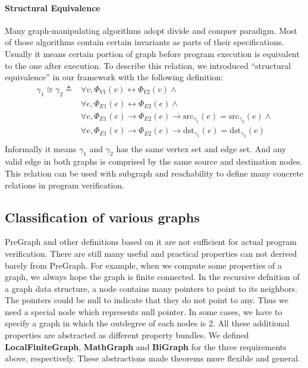\paragraph{Structural Equivalence}
Many graph-manipulating algorithms adopt divide and conquer
paradigm. Most of those algorithms contain certain invariants as parts
of their specifications. Usually it means certain portion of graph
before program execution is equivalent to the one after execution. To
describe this relation, we introduced ``structural equivalence'' in
our framework with the following definition:
\begin{equation*}
\begin{split}
\gamma_1 \cong\gamma_2 \triangleq & \forall v, \Phi_{V1}(v) \leftrightarrow \Phi_{V2}(v) \wedge \\
& \forall e, \Phi_{E1}(e) \leftrightarrow \Phi_{E2}(e) \wedge\\
& \forall e, \Phi_{E1}(e) \rightarrow \Phi_{E2}(e) \rightarrow \text{src}_{\gamma_1}(e)=\text{src}_{\gamma_2}(e) \wedge\\
& \forall e, \Phi_{E1}(e) \rightarrow \Phi_{E2}(e) \rightarrow \text{dst}_{\gamma_1}(e)=\text{dst}_{\gamma_2}(e)\\
\end{split}
\end{equation*}
Informally it means $\gamma_1$ and $\gamma_2$ has the same vertex set
and edge set. And any valid edge in both graphs is comprised by the
same source and destination nodes. This relation can be used with
subgraph and reachability to define many concrete relations in program
verification.

\subsection{Classification of various graphs}

PreGraph and other definitions based on it are not sufficient for
actual program verification. There are still many useful and practical
properties can not derived barely from PreGraph. For example, when we
compute some properties of a graph, we always hope the graph is finite
connected. In the recursive defnition of a graph data structure, a
node contains many pointers to point to its neighbors. The pointers
could be null to indicate that they do not point to any. Thus we need
a special node which represents null pointer. In some cases, we have
to specify a graph in which the outdegree of each nodes is 2. All
these additional properties are abstracted as different property
bundles. We defined \textbf{LocalFiniteGraph}, \textbf{MathGraph}
and \textbf{BiGraph} for the three requirements above,
respectively. These abstractions made theorems more flexible and
general.

